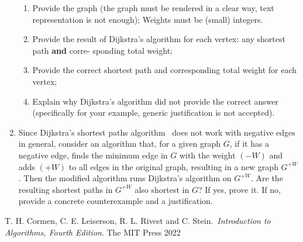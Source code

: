 \documentclass{article}
\begin{document}
\begin{enumerate}
          \begin{enumerate}
              \item Provide the graph (the graph must be rendered in a clear way, text representation is not
                    enough); Weights must be (small) integers.
                    
              \item Provide the result of Dijkstra's algorithm for each vertex: any shortest path \textbf{and} corre-
                    sponding total weight;
                    
              \item Provide the correct shortest path and corresponding total weight for each vertex;
                    
              \item Explain why Dijkstra's algorithm did not provide the correct answer (specifically for your
                    example, generic justification is not accepted).
          \end{enumerate}
          
    \item Since Dijkstra's shortest paths algorithm~\cite[\S 22.3]{cormen} does not work with negative edges in
          general, consider an algorithm that, for a given graph \(G\), if it has a negative edge, finds the
          minimum edge in \(G\) with the weight \((-W)\) and adds \((+W)\) to all edges in the original graph,
          resulting in a new graph \(G^{+W}\). Then the modified algorithm runs Dijkstra's algorithm on \(G^{+W}\).
          Are the resulting shortest paths in \(G^{+W}\) also shortest in \(G\)? If yes, prove it. If no, provide a
          concrete counterexample and a justification.
\end{enumerate}

\begin{thebibliography}{.week-13.}
     T. H. Cormen, C. E. Leiserson, R. L. Rivest and C. Stein.\ \emph{Introduction to Algorithms,
        Fourth Edition}. The MIT Press 2022
\end{thebibliography}
\end{document}
